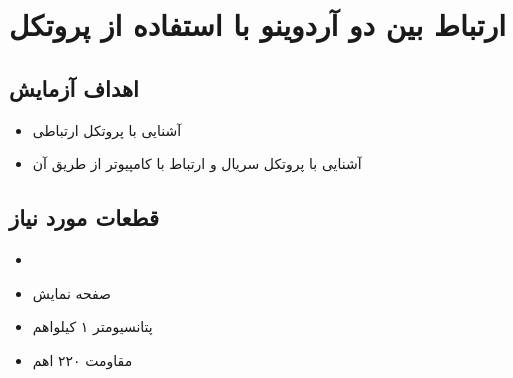 \section{ارتباط بین دو آردوینو با استفاده از پروتکل }

\subsection{اهداف آزمایش}
\begin{itemize}
    \item آشنایی با پروتکل ارتباطی 
    \item آشنایی با پروتکل سریال و ارتباط با کامپیوتر از طریق آن
\end{itemize}

\subsection{قطعات مورد نیاز}
\begin{itemize}
    \item {}
    \item صفحه نمایش 
    \item پتانسیومتر ۱ کیلواهم 
    \item مقاومت ۲۲۰ اهم

\end{itemize}

